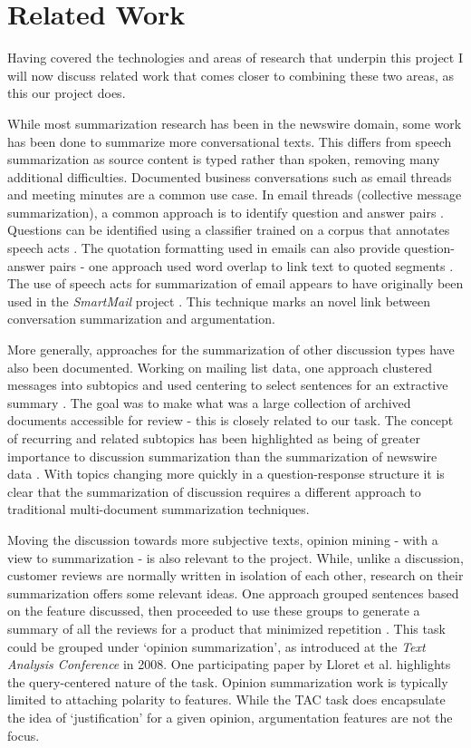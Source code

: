   \section{Related Work}
    Having covered the technologies and areas of research that underpin this project I will now discuss related work that comes closer to combining these two areas, as this our project does.

    While most summarization research has been in the newswire domain, some work has been done to summarize more conversational texts. This differs from speech summarization as source content is typed rather than spoken, removing many additional difficulties. Documented business conversations such as email threads and meeting minutes are a common use case. In email threads (collective message summarization), a common approach is to identify question and answer pairs \cite{shrestha2007using,shrestha2004detection,carenini2007summarizing}. Questions can be identified using a classifier trained on a corpus that annotates speech acts \cite{shrestha2004detection}. The quotation formatting used in emails can also provide question-answer pairs - one approach used word overlap to link text to quoted segments \cite{carenini2007summarizing}. The use of speech acts for summarization of email appears to have originally been used in the \textit{SmartMail} project \cite{corston2004task}. This technique marks an novel link between conversation summarization and argumentation.

    More generally, approaches for the summarization of other discussion types have also been documented. Working on mailing list data, one approach clustered messages into subtopics and used centering to select sentences for an extractive summary \cite{newman2003summarizing}. The goal was to make what was a large collection of archived documents accessible for review - this is closely related to our task. The concept of recurring and related subtopics has been highlighted as being of greater importance to discussion summarization than the summarization of newswire data \cite{zhou2006summarization}. With topics changing more quickly in a question-response structure it is clear that the summarization of discussion requires a different approach to traditional multi-document summarization techniques.

    Moving the discussion towards more subjective texts, opinion mining - with a view to summarization - is also relevant to the project. While, unlike a discussion, customer reviews are normally written in isolation of each other, research on their summarization offers some relevant ideas. One approach grouped sentences based on the feature discussed, then proceeded to use these groups to generate a summary of all the reviews for a product that minimized repetition \cite{hu2004mining}. This task could be grouped under `opinion summarization', as introduced at the \textit{Text Analysis Conference} in 2008. One participating paper by Lloret et al. \cite{lloret2009towards} highlights the query-centered nature of the task. Opinion summarization work is typically limited to attaching polarity to features. While the TAC task does encapsulate the idea of `justification' for a given opinion, argumentation features are not the focus.

